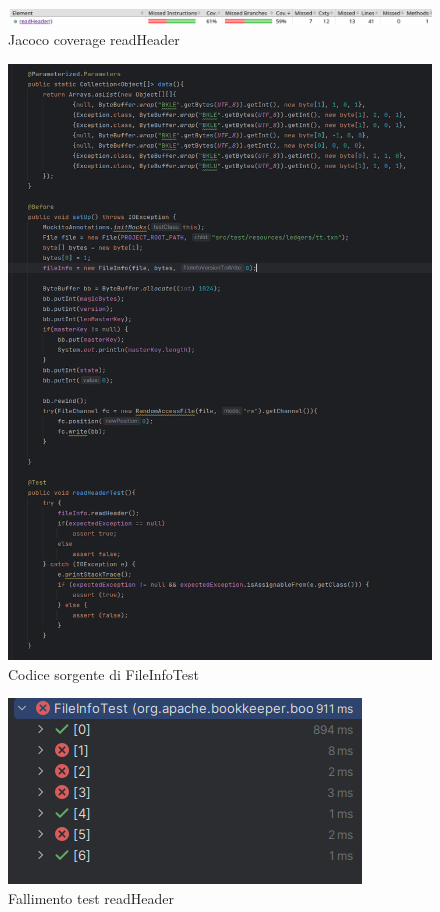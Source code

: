 \documentclass[10pt, a4paper]{article}
\begin{document}
  \begin{figure}
    \includegraphics[width=\linewidth]{./images/file_info/JacocoCoveragereadHeader1.png}
    \caption{Jacoco coverage readHeader}
    \label{fig:JacocoCoveragereadHeader1}
  \end{figure}
  \begin{figure}
    \includegraphics[width=\linewidth]{./images/file_info/Code1ReadHeader.png}
    \caption{Codice sorgente di FileInfoTest}
    \label{fig:Code1ReadHeader}
  \end{figure}

  \begin{figure}
    \includegraphics[width=\linewidth]{./images/file_info/TestFailsReadHeader.png}
    \caption{Fallimento test readHeader}
    \label{fig:TestFailsReadHeader}
  \end{figure}  
\end{document}
